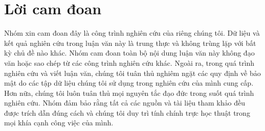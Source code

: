 \chapter*{Lời cam đoan}
\label{reassurances}

Nhóm xin cam đoan đây là công trình nghiên cứu của riêng chúng
tôi. Dữ liệu và kết quả nghiên cứu trong luận văn này là trung thực và
không trùng lặp với bất kỳ chủ đề nào khác. Nhóm cam đoan toàn
bộ nội dung luận văn này không đạo văn hoặc sao chép từ các công trình
nghiên cứu khác. Ngoài ra, trong quá trình nghiên cứu và viết luận văn,
chúng tôi tuân thủ nghiêm ngặt các quy định về bảo mật do các tập dữ liệu
chúng tôi sử dụng trong nghiên cứu của mình cung cấp. Hơn nữa, chúng
tôi luôn tuân thủ mọi nguyên tắc đạo đức trong suốt quá trình nghiên cứu.
Nhóm đảm bảo rằng tất cả các nguồn và tài liệu tham khảo đều được
trích dẫn đúng cách và chúng tôi duy trì tính chính trực học thuật trong
mọi khía cạnh công việc của mình.

